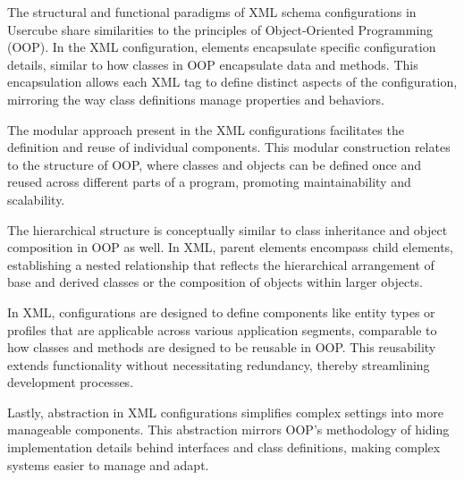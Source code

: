 The structural and functional paradigms of XML schema configurations in Usercube share similarities to the principles of Object-Oriented Programming (OOP). In the XML configuration, elements encapsulate specific configuration details, similar to how classes in OOP encapsulate data and methods. This encapsulation allows each XML tag to define distinct aspects of the configuration, mirroring the way class definitions manage properties and behaviors.

The modular approach present in the XML configurations facilitates the definition and reuse of individual components. This modular construction relates to the structure of OOP, where classes and objects can be defined once and reused across different parts of a program, promoting maintainability and scalability.

The hierarchical structure is conceptually similar to class inheritance and object composition in OOP as well. In XML, parent elements encompass child elements, establishing a nested relationship that reflects the hierarchical arrangement of base and derived classes or the composition of objects within larger objects.

In XML, configurations are designed to define components like entity types or profiles that are applicable across various application segments, comparable to how classes and methods are designed to be reusable in OOP. This reusability extends functionality without necessitating redundancy, thereby streamlining development processes.

Lastly, abstraction in XML configurations simplifies complex settings into more manageable components. This abstraction mirrors OOP’s methodology of hiding implementation details behind interfaces and class definitions, making complex systems easier to manage and adapt.

